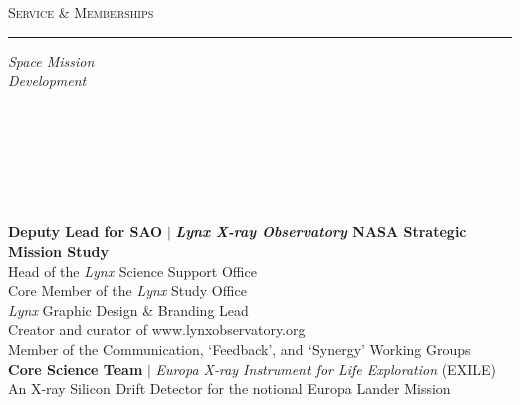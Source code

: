 \documentclass[11pt]{article}
\makeatletter
\def\vhrulefill#1{\leavevmode\leaders\hrule\@height#1\hfill \kern\z@}
\makeatother
\begin{document}
\vspace{4mm}

\textsc{Service \& Memberships} \vhrulefill{0.4pt}



\vspace{4mm}

\hspace{2.5mm} \parbox{1.5in}{\textit{Space Mission \\ Development\\\\\\\\\\\\\\} } \parbox{5.15in}{
\textbf{Deputy Lead for SAO} $|$ \textbf{\textit{Lynx X-ray Observatory} NASA Strategic Mission Study} \\
Head of the \textit{Lynx} Science Support Office \\
Core Member of the \textit{Lynx} Study Office\\
\textit{Lynx} Graphic Design \& Branding Lead\\
Creator and curator of www.lynxobservatory.org \\
Member of the Communication, `Feedback', and `Synergy' Working Groups\\


\textbf{Core Science Team} $|$ \textit{Europa X-ray Instrument for Life Exploration} (EXILE)\\
An X-ray Silicon Drift Detector for the notional Europa Lander Mission} \\


\vspace{4mm}
\end{document}
